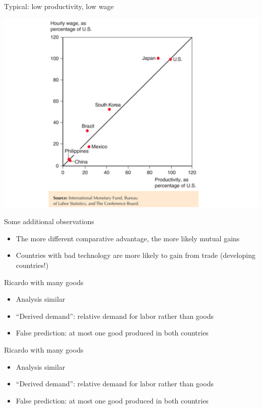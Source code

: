\documentclass[ignorenonframetext,]{beamer}
\begin{document}
\begin{frame}{Typical: low productivity, low wage}

    \includegraphics[scale=0.25]{low_prod_low_wage.png}

\end{frame}

\begin{frame}{Some additional observations}

    \begin{itemize}
        \item The more different comparative advantage, the more likely mutual gains
        \item Countries with bad technology are more likely to gain from trade (developing countries!)
    \end{itemize}

\end{frame}

\begin{frame}{Ricardo with many goods}

    \begin{itemize}
        \item Analysis similar
        \item ``Derived demand'': relative demand for labor rather than goods 
        \item False prediction: at most one good produced in both countries
    \end{itemize}

\end{frame}

\begin{frame}{Ricardo with many goods}

    \begin{itemize}
        \item Analysis similar
        \item ``Derived demand'': relative demand for labor rather than goods 
        \item False prediction: at most one good produced in both countries
    \end{itemize}

\end{frame}
\end{document}
